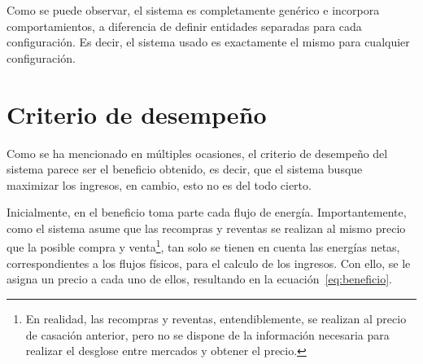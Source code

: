 Como se puede observar, el sistema es completamente genérico e incorpora comportamientos, a diferencia de definir entidades separadas para cada configuración. Es decir, el sistema usado es exactamente el mismo para cualquier configuración.

\section{Criterio de desempeño}
\label{makereference5.3}

Como se ha mencionado en múltiples ocasiones, el criterio de desempeño del sistema parece ser el beneficio obtenido, es decir, que el sistema busque maximizar los ingresos, en cambio, esto no es del todo cierto.

Inicialmente, en el beneficio toma parte cada flujo de energía. Importantemente, como el sistema asume que las recompras y reventas se realizan al mismo precio que la posible compra y venta\footnote{En realidad, las recompras y reventas, entendiblemente, se realizan al precio de casación anterior, pero no se dispone de la información necesaria para realizar el desglose entre mercados y obtener el precio.}, tan solo se tienen en cuenta las energías netas, correspondientes a los flujos físicos, para el calculo de los ingresos. Con ello, se le asigna un precio a cada uno de ellos, resultando en la ecuación~\ref{eq:beneficio}.

